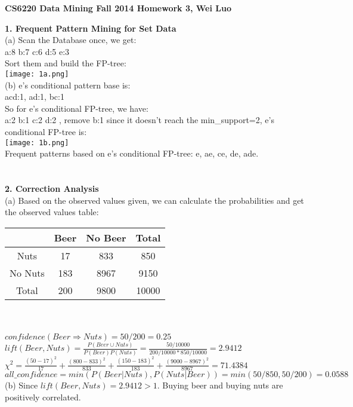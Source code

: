 \documentclass[11pt,a4paper,fleqn]{article}
\begin{document}
\begin{center}
\textbf{CS6220 Data Mining Fall 2014 Homework 3, Wei Luo}\\
\end{center}
\textbf{1. Frequent Pattern Mining for Set Data}\\
(a) Scan the Database once, we get:\\
a:8 b:7 c:6 d:5 e:3\\
Sort them and build the FP-tree:\\
\texttt{[image: 1a.png]}\\
(b) e's conditional pattern base is:\\
acd:1, ad:1, bc:1\\
So for e's conditional FP-tree, we have:\\
a:2 b:1 c:2 d:2 , remove b:1 since it doesn't reach the min\_support=2, e's conditional FP-tree is:\\
\texttt{[image: 1b.png]}\\
Frequent patterns based on e's conditional FP-tree: e, ae, ce, de, ade.\\ \\ \\
\textbf{2. Correction Analysis}\\
(a) Based on the observed values given, we can calculate the probabilities and get the observed values table:\\
\begin{tabular}{|c|c|c|c|}
\hline
 &Beer&No Beer&Total\\
\hline
Nuts&17&833&850\\
\hline
No Nuts&183&8967&9150\\
\hline
Total&200&9800&10000\\
\hline
\end{tabular}\\ \\
$confidence(Beer \Rightarrow Nuts) = 50/200 = 0.25$\\
$lift(Beer,Nuts) = \frac{P(Beer \cup Nuts)}{P(Beer)P(Nuts)} = \frac{50/10000}{200/10000*850/10000} = 2.9412$\\
$\chi ^2 = \frac{(50-17)^2}{17}+\frac{(800-833)^2}{833}+\frac{(150-183)^2}{183}+\frac{(9000-8967)^2}{8967}= 71.4384$\\
$all\_confidence = min(P(Beer|Nuts),P(Nuts|Beer)) = min(50/850, 50/200) = 0.0588$\\
(b) Since $lift(Beer,Nuts) = 2.9412 > 1$. Buying beer and buying nuts are positively correlated.\\
\end{document}
